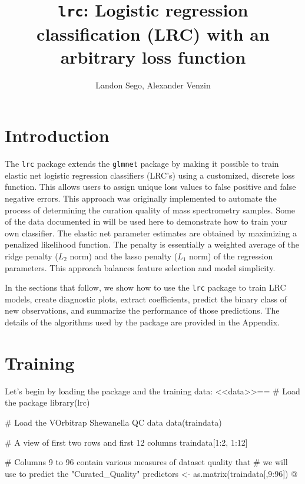 \documentclass{article}
\begin{document}
 

\title{{\tt lrc}: Logistic regression classification (LRC) with an arbitrary loss function\\}
\author{Landon Sego, Alexander Venzin}
\maketitle

\section{Introduction}

The {\tt lrc} package extends the {\tt glmnet} package by making it possible to train elastic net logistic 
regression classifiers (LRC's) using a customized, discrete loss function.  This allows users to assign unique 
loss values to false positive and false negative errors. This approach was originally implemented to automate the
process of determining the curation quality of mass spectrometry samples. Some of the data documented in 
\cite{thepaper} will be used here to demonstrate how to train your own classifier. The elastic net parameter
estimates are obtained by maximizing a penalized likelihood function. The penalty is essentially a weighted average
of the ridge penalty ($L_2$ norm) and the lasso penalty ($L_1$ norm) of the regression parameters.  This
approach balances feature selection and model simplicity. 

In the sections that follow, we show how to use the {\tt lrc} package to train LRC models, create diagnostic plots,
extract coefficients, predict the binary class of new observations, and summarize the performance of those
predictions. The details of the algorithms used by the package are provided in the Appendix.

\section{Training}

Let's begin by loading the package and the training data:
<<data>>==
# Load the package
library(lrc)

# Load the VOrbitrap Shewanella QC data
data(traindata)

# A view of first two rows and first 12 columns
traindata[1:2, 1:12]

# Columns 9 to 96 contain various measures of dataset quality that
# we will use to predict the "Curated_Quality"
predictors <- as.matrix(traindata[,9:96])
@ 
\end{document}
